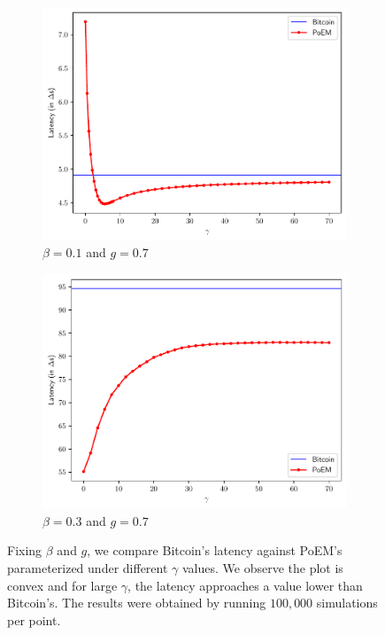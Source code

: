 \begin{figure}[h]
    \centering
    \begin{subfigure}{0.8\textwidth}
    \centering
    \includegraphics[width = \textwidth]{figures/gamma_latency_0.1.pdf}
    \caption{$\beta = 0.1$ and $g = 0.7$}
    \label{fig:gamma_latency_0.1}
    \end{subfigure}
    \begin{subfigure}{0.8\textwidth}
    \centering
    \includegraphics[width = \textwidth]{figures/gamma_latency_0.3.pdf}
    \caption{$\beta = 0.3$ and $g = 0.7$}
    \label{fig:gamma_latency_0.3}
    \end{subfigure}

  \caption{Fixing $\beta$ and $g$, we compare Bitcoin's latency against PoEM's parameterized under different $\gamma$ values.
          We observe the plot is convex and for large $\gamma$, the latency
          approaches a value lower than Bitcoin's. The results were obtained by running $100{,}000$ simulations per point.}
    \label{fig:gamma_latency}
\end{figure}